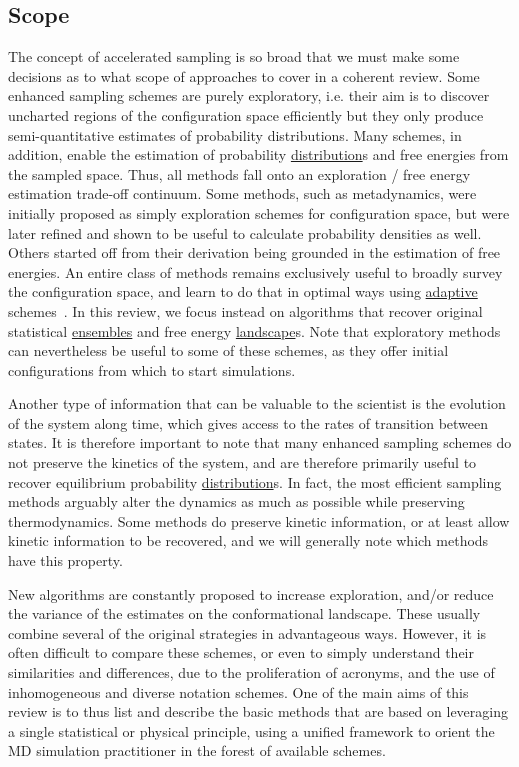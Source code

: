 \documentclass[9pt,review]{livecoms}
\begin{document}
\subsection{Scope}
The concept of accelerated sampling is so broad that we must make some decisions as to what scope of approaches to cover in a coherent review.
Some enhanced sampling schemes are purely exploratory, i.e. their aim is to discover uncharted regions of the configuration space efficiently but they only produce semi-quantitative estimates of probability distributions. Many schemes, in addition, enable the estimation of probability \hyperlink{ref:Distribution} {distribution}s and free energies from the sampled space. Thus, all methods fall onto an exploration / free energy estimation trade-off continuum. Some methods, such as metadynamics, were initially proposed as simply exploration schemes for configuration space, but were later refined and shown to be useful to calculate probability densities as well.  Others started off from their derivation being grounded in the estimation of free energies. An entire class of methods remains exclusively useful to broadly survey the configuration space, and learn to do that in optimal ways using \hyperlink{ref:Adaptive} {adaptive} schemes~\cite{ChiavazzoE5494}. In this review, we focus instead on algorithms that recover original statistical \hyperlink{ref:Ensemble} {ensembles} and free energy \hyperlink{ref:FES} {landscape}s. Note that exploratory methods can nevertheless be useful to some of these schemes, as they offer initial configurations from which to start simulations.

Another type of information that can be valuable to the scientist is the evolution of the system along time, which gives access to the rates of transition between states. It is therefore important to note that many enhanced sampling schemes do not preserve the kinetics of the system, and are therefore primarily useful to recover equilibrium probability \hyperlink{ref:Distribution} {distribution}s. In fact, the most efficient sampling methods arguably alter the dynamics as much as possible while preserving thermodynamics. Some methods do preserve kinetic information, or at least allow kinetic information to be recovered, and we will generally note which methods have this property.

New algorithms are constantly proposed to increase exploration, and/or reduce the variance of the estimates on the conformational landscape. These usually combine several of the original strategies in advantageous ways. However, it is often difficult to compare these schemes, or even to simply understand their similarities and differences, due to the proliferation of acronyms, and the use of inhomogeneous and diverse notation schemes. One of the main aims of this review is to thus list and describe the basic methods that are based on leveraging a single statistical or physical principle, using a unified framework to orient the MD simulation practitioner in the forest of available schemes.
\end{document}
